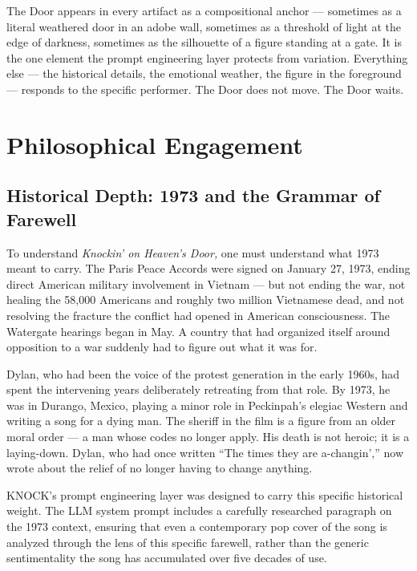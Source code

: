 \documentclass[12pt, a4paper]{article}
\begin{document}
The Door appears in every artifact as a compositional anchor --- sometimes as a
literal weathered door in an adobe wall, sometimes as a threshold of light at the
edge of darkness, sometimes as the silhouette of a figure standing at a gate. It is
the one element the prompt engineering layer protects from variation. Everything else
--- the historical details, the emotional weather, the figure in the foreground ---
responds to the specific performer. The Door does not move. The Door waits.

\section{Philosophical Engagement}

\subsection{Historical Depth: 1973 and the Grammar of Farewell}

To understand \textit{Knockin' on Heaven's Door,} one must understand what 1973
meant to carry. The Paris Peace Accords were signed on January 27, 1973, ending
direct American military involvement in Vietnam --- but not ending the war, not
healing the 58,000 Americans and roughly two million Vietnamese dead, and not
resolving the fracture the conflict had opened in American consciousness. The
Watergate hearings began in May. A country that had organized itself around
opposition to a war suddenly had to figure out what it was for.

Dylan, who had been the voice of the protest generation in the early 1960s, had
spent the intervening years deliberately retreating from that role. By 1973, he was
in Durango, Mexico, playing a minor role in Peckinpah's elegiac Western and writing
a song for a dying man. The sheriff in the film is a figure from an older moral
order --- a man whose codes no longer apply. His death is not heroic; it is a
laying-down. Dylan, who had once written ``The times they are a-changin','' now
wrote about the relief of no longer having to change anything.

KNOCK's prompt engineering layer was designed to carry this specific historical
weight. The LLM system prompt includes a carefully researched paragraph on the 1973
context, ensuring that even a contemporary pop cover of the song is analyzed through
the lens of this specific farewell, rather than the generic sentimentality the song
has accumulated over five decades of use.
\end{document}
